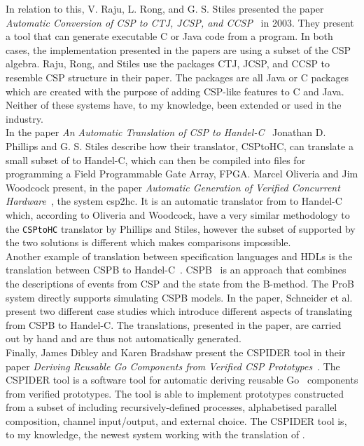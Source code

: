 In relation to this, V. Raju, L. Rong, and G. S. Stiles presented the paper \textit{Automatic Conversion of CSP to CTJ, JCSP, and CCSP}~\cite{Raju2003} in 2003. They present a tool that can generate executable C or Java code from a \cspm{} program. In both cases, the implementation presented in the papers are using a subset of the CSP algebra. Raju,
Rong, and Stiles use the packages CTJ, JCSP, and CCSP to resemble CSP structure in their paper. The packages are all Java or C packages which are created with the purpose of adding CSP-like features to C and Java. Neither of these systems have, to my knowledge, been extended or used in the industry.\\

In the paper \textit{An Automatic Translation of CSP to Handel-C}~\cite{Phillips2004} Jonathan D. Phillips and G. S. Stiles describe how their translator, CSPtoHC, can translate a small subset of \cspm{} to Handel-C\cite{Celoxia2002}, which can then be compiled into files for programming a Field Programmable Gate
Array, FPGA.
Marcel Oliveria and Jim Woodcock present, in the paper \textit{Automatic Generation of Verified Concurrent Hardware}~\cite{Oliveira2007}, the system csp2hc. It is an automatic translator from \cspm{} to Handel-C which, according to Oliveria and Woodcock, have a very similar methodology to the \texttt{CSPtoHC} translator by Phillips and Stiles, however the subset of \cspm{} supported by the two solutions is different which makes comparisons impossible.\\

Another example of translation between specification languages and HDLs is the translation between CSP\textbar\textbar B to Handel-C~\cite{Schneider08}. CSP\textbar\textbar B~\cite{Schneider2002a} is an approach that combines the descriptions of events from CSP and the state from the B-method. The ProB system\cite{ProB}\cite{Leuschel2003} directly supports simulating CSP\textbar\textbar B models. In the paper,  Schneider et al. present two different case studies which introduce different aspects of translating from CSP\textbar\textbar B to Handel-C. The translations, presented in the paper, are carried out by hand and are thus not automatically generated.\\

Finally, James Dibley and Karen Bradshaw present the CSPIDER tool in their paper \textit{Deriving Reusable Go Components from Verified CSP Prototypes}~\cite{Dibley2018}. The CSPIDER tool is a software tool for automatic deriving reusable Go~\cite{Go} components from verified \cspm{} prototypes. The tool is able to implement prototypes constructed from a subset of \cspm{} including recursively-defined processes, alphabetised parallel composition, channel input/output, and external choice. The CSPIDER tool is, to my knowledge, the newest system working with the translation of \cspm{}.